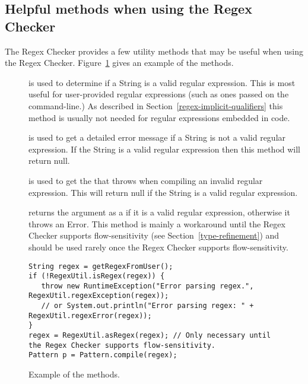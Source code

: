 \subsection{Helpful methods when using the Regex Checker\label{regex-methods}}

The Regex Checker provides a few utility methods that may be useful when
using the Regex Checker. Figure~\ref{fig:regex-util-example} gives an
example of the  methods.

\begin{description}

\item[]
  is used to determine if a String is a valid regular expression. This is
  most useful for user-provided regular expressions (such as ones passed
  on the command-line.) As described in Section~\ref{regex-implicit-qualifiers}
  this method is usually not needed for regular expressions embedded in
  code.

\item[]
  is used to get a detailed error message if a String is not a valid
  regular expression. If the String is a valid regular expression then
  this method will return null.

\item[]
  is used to get the
  that 
  throws when compiling an invalid regular expression. This will
  return null if the String is a valid regular expression.

\item[]
  returns the argument as a  if it is a valid
  regular expression, otherwise it throws an Error. This method is
  mainly a workaround until the Regex Checker supports
  flow-sensitivity (see Section~\ref{type-refinement}) and should
  be used rarely once the Regex Checker supports flow-sensitivity.

\end{description}

\begin{figure}
\begin{smaller}
\begin{Verbatim}
String regex = getRegexFromUser();
if (!RegexUtil.isRegex(regex)) {
   throw new RuntimeException("Error parsing regex.", RegexUtil.regexException(regex));
   // or System.out.println("Error parsing regex: " + RegexUtil.regexError(regex));
}
regex = RegexUtil.asRegex(regex); // Only necessary until the Regex Checker supports flow-sensitivity.
Pattern p = Pattern.compile(regex);
\end{Verbatim}
\end{smaller}
\caption{Example of the  methods.}
\label{fig:regex-util-example}
\end{figure}

